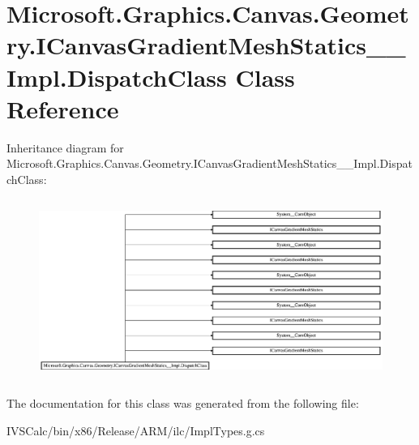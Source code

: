 \hypertarget{class_microsoft_1_1_graphics_1_1_canvas_1_1_geometry_1_1_i_canvas_gradient_mesh_statics_____impl_1_1_dispatch_class}{}\section{Microsoft.\+Graphics.\+Canvas.\+Geometry.\+I\+Canvas\+Gradient\+Mesh\+Statics\+\_\+\+\_\+\+Impl.\+Dispatch\+Class Class Reference}
\label{class_microsoft_1_1_graphics_1_1_canvas_1_1_geometry_1_1_i_canvas_gradient_mesh_statics_____impl_1_1_dispatch_class}
Inheritance diagram for Microsoft.\+Graphics.\+Canvas.\+Geometry.\+I\+Canvas\+Gradient\+Mesh\+Statics\+\_\+\+\_\+\+Impl.\+Dispatch\+Class\+:\begin{figure}[H]
\begin{center}
\leavevmode
\includegraphics[height=5.934489cm]{class_microsoft_1_1_graphics_1_1_canvas_1_1_geometry_1_1_i_canvas_gradient_mesh_statics_____impl_1_1_dispatch_class}
\end{center}
\end{figure}


The documentation for this class was generated from the following file\+:\begin{DoxyCompactItemize}
\item 
I\+V\+S\+Calc/bin/x86/\+Release/\+A\+R\+M/ilc/Impl\+Types.\+g.\+cs\end{DoxyCompactItemize}
